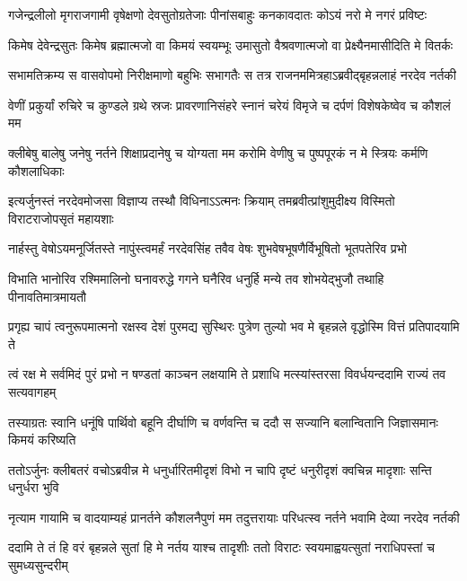 \twolineshloka
{गजेन्द्रलीलो मृगराजगामी वृषेक्षणो देवसुतोग्रतेजाः}
{पीनांसबाहुः कनकावदातः कोऽयं नरो मे नगरं प्रविष्टः}


\twolineshloka
{किमेष देवेन्द्रसुतः किमेष ब्रह्मात्मजो वा किमयं स्वयम्भूः}
{उमासुतो वैश्रवणात्मजो वा प्रेक्ष्यैनमासीदिति मे वितर्कः}



\twolineshloka
{सभामतिक्रम्य स वासवोपमो निरीक्षमाणो बहुभिः सभागतैः}
{स तत्र राजनममित्रहाऽब्रवीद्बृहन्नलाहं नरदेव नर्तकी}


\twolineshloka
{वेणीं प्रकुर्यां रुचिरे च कुण्डले ग्रथे स्रजः प्रावरणानिसंहरे}
{स्नानं चरेयं विमृजे च दर्पणं विशेषकेष्वेव च कौशलं मम}





\twolineshloka
{क्लीबेषु बालेषु जनेषु नर्तने शिक्षाप्रदानेषु च योग्यता मम}
{करोमि वेणीषु च पुष्पपूरकं न मे स्त्रियः कर्मणि कौशलाधिकाः}


\twolineshloka
{इत्यर्जुनस्तं नरदेवमोजसा विज्ञाप्य तस्थौ विधिनाऽऽत्मनः क्रियाम्}
{तमब्रवीत्प्रांशुमुदीक्ष्य विस्मितो विराटराजोपसृतं महायशाः}


\twolineshloka
{नार्हस्तु वेषोऽयमनूर्जितस्ते नापुंस्त्वमर्हं नरदेवसिंह}
{तवैव वेषः शुभवेषभूषणैर्विभूषितो भूतपतेरिव प्रभो}


\twolineshloka
{विभाति भानोरिव रश्मिमालिनो घनावरुद्धे गगने घनैरिव}
{धनुर्हि मन्ये तव शोभयेद्भुजौ तथाहि पीनावतिमात्रमायतौ}


\twolineshloka
{प्रगृह्य चापं त्वनुरूपमात्मनो रक्षस्व देशं पुरमद्य सुस्थिरः}
{पुत्रेण तुल्यो भव मे बृहन्नले वृद्धोस्मि वित्तं प्रतिपादयामि ते}


\twolineshloka
{त्वं रक्ष मे सर्वमिदं पुरं प्रभो न षण्डतां काञ्चन लक्षयामि ते}
{प्रशाधि मत्स्यांस्तरसा विवर्धयन्ददामि राज्यं तव सत्यवागहम्}



\twolineshloka
{तस्याग्रतः स्वानि धनूंषि पार्थिवो बहूनि दीर्घाणि च वर्णवन्ति च}
{ददौ स सज्यानि बलान्वितानि जिज्ञासमानः किमयं करिष्यति}


\twolineshloka
{ततोऽर्जुनः क्लीबतरं वचोऽब्रवीन्न मे धनुर्धारितमीदृशं विभो}
{न चापि दृष्टं धनुरीदृशं क्वचिन्न मादृशाः सन्ति धनुर्धरा भुवि}


\twolineshloka
{नृत्याम गायामि च वादयाम्यहं प्रानर्तने कौशलनैपुणं मम}
{तदुत्तरायाः परिधत्स्व नर्तने भवामि देव्या नरदेव नर्तकी}




\twolineshloka
{ददामि ते तं हि वरं बृहन्नले सुतां हि मे नर्तय याश्च तादृशीः}
{ततो विराटः स्वयमाह्वयत्सुतां नराधिपस्तां च सुमध्यसुन्दरीम्}



